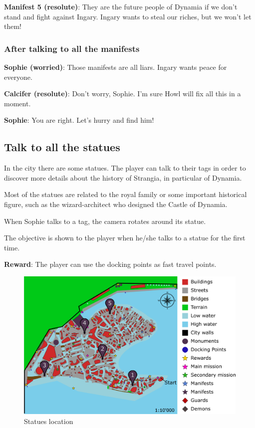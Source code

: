 \textbf{Manifest 5 (resolute)}: They are the future people of Dynamia if we don't stand and fight against Ingary. Ingary wants to steal our riches, but we won't let them!

\subsubsection*{After talking to all the manifests}
\textbf{Sophie (worried)}: Those manifests are all liars. Ingary wants peace for everyone.

\textbf{Calcifer (resolute)}: Don't worry, Sophie. I'm sure Howl will fix all this in a moment.

\textbf{Sophie}: You are right. Let's hurry and find him!


\subsection{Talk to all the statues}
In the city there are some statues. The player can talk to their tags in order to discover more details about the history of Strangia, in particular of Dynamia.

Most of the statues are related to the royal family or some important historical figure, such as the wizard-architect who designed the Castle of Dynamia.

When Sophie talks to a tag, the camera rotates around its statue.

The objective is shown to the player when he/she talks to a statue for the first time.

\textbf{Reward}: The player can use the docking points as fast travel points.

\begin{figure}[H]
  \centering
  \includegraphics[width=\textwidth]{../Images/Maps/dynamiaSecondaryMissions_Statues}
  \caption{Statues location}
\end{figure}


